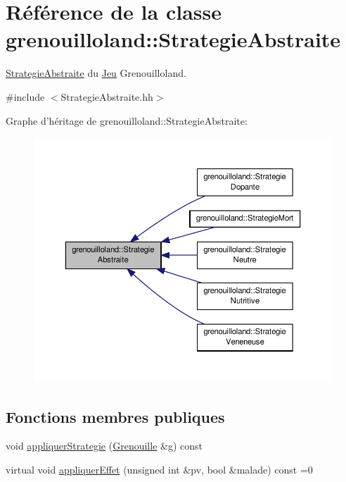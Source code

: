\hypertarget{classgrenouilloland_1_1StrategieAbstraite}{\section{Référence de la classe grenouilloland\-:\-:Strategie\-Abstraite}
\label{classgrenouilloland_1_1StrategieAbstraite}
}


\hyperlink{classgrenouilloland_1_1StrategieAbstraite}{Strategie\-Abstraite} du \hyperlink{classgrenouilloland_1_1Jeu}{Jeu} Grenouilloland.  




{\ttfamily \#include $<$Strategie\-Abstraite.\-hh$>$}



Graphe d'héritage de grenouilloland\-:\-:Strategie\-Abstraite\-:
\nopagebreak
\begin{figure}[H]
\begin{center}
\leavevmode
\includegraphics[width=350pt]{classgrenouilloland_1_1StrategieAbstraite__inherit__graph}
\end{center}
\end{figure}
\subsection*{Fonctions membres publiques}
\begin{DoxyCompactItemize}
\item 
void \hyperlink{classgrenouilloland_1_1StrategieAbstraite_a00d3b038cba36687274e6fec37d28417}{appliquer\-Strategie} (\hyperlink{classgrenouilloland_1_1Grenouille}{Grenouille} \&g) const 
\item 
virtual void \hyperlink{classgrenouilloland_1_1StrategieAbstraite_a1355917a007ab0c5e5ed358e2eee93c2}{appliquer\-Effet} (unsigned int \&pv, bool \&malade) const =0
\end{DoxyCompactItemize}


